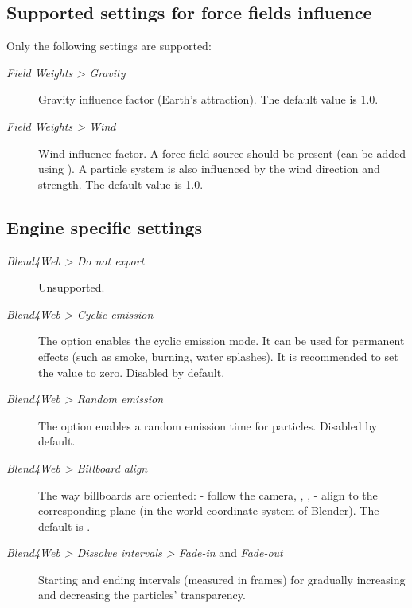\documentclass[a4paper,12pt,oneside]{sphinxmanual}
\begin{document}
\subsection{Supported settings for force fields influence}
\label{particles:id12}\label{particles:particles-force-fields}
Only the following settings are supported:
\begin{description}
\item[{\emph{Field Weights \textgreater{} Gravity}}] \leavevmode
Gravity influence factor (Earth's attraction). The default value is 1.0.

\item[{\emph{Field Weights \textgreater{} Wind}}] \leavevmode
Wind influence factor. A  force field source should be present (can be added using ). A particle system is also influenced by the wind direction and strength. The default value is 1.0.

\end{description}


\subsection{Engine specific settings}
\label{particles:id13}\begin{description}
\item[{\emph{Blend4Web \textgreater{} Do not export}}] \leavevmode
Unsupported.

\item[{\emph{Blend4Web \textgreater{} Cyclic emission}}] \leavevmode
The option enables the cyclic emission mode. It can be used for permanent effects (such as smoke, burning, water splashes). It is recommended to set the  value to zero. Disabled by default.

\item[{\emph{Blend4Web \textgreater{} Random emission}}] \leavevmode
The option enables a random emission time for particles. Disabled by default.

\item[{\emph{Blend4Web \textgreater{} Billboard align}}] \leavevmode
The way billboards are oriented:  - follow the camera, , ,  - align to the corresponding plane (in the world coordinate system of Blender). The default is .

\item[{\emph{Blend4Web \textgreater{} Dissolve intervals \textgreater{} Fade-in} and \emph{Fade-out}}] \leavevmode
Starting and ending intervals (measured in frames) for gradually increasing and decreasing the particles' transparency.

\end{description}
\end{document}
